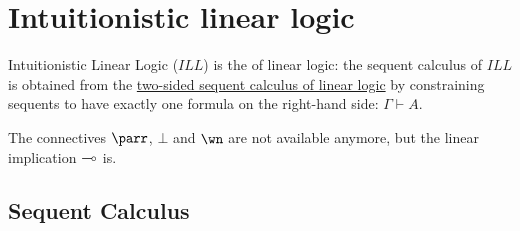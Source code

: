 \chapter{Intuitionistic linear logic}\label{intuitionistic-linear-logic}

Intuitionistic Linear Logic (\(ILL\)) is the
 of
linear logic: the sequent calculus of \(ILL\) is obtained from the
\hyperref[sequents-and-proofs]{two-sided sequent calculus
of linear logic} by constraining sequents to have exactly one formula on
the right-hand side: \(\Gamma\vdash A\).

The connectives \(\parr\), \(\bot\) and \(\wn\) are not available
anymore, but the linear implication \(\multimap\) is.

\section{Sequent Calculus}

